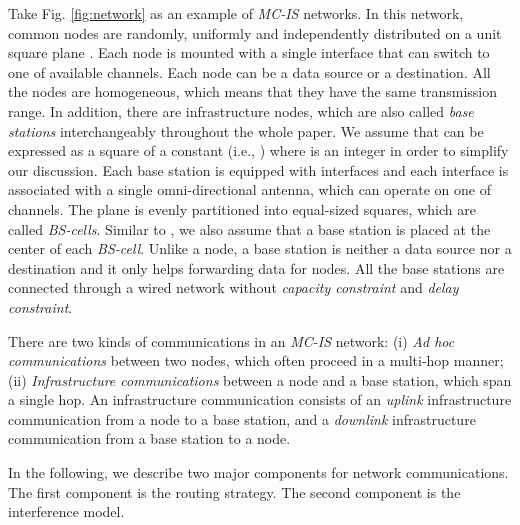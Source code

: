 \documentclass[10pt,journal]{IEEEtran}
\begin{document}
Take Fig. \ref{fig:network} as an example of \textit{MC-IS} networks. In this network,  common nodes are randomly, uniformly and independently distributed on a unit square plane . Each node is mounted with a single interface that can switch to one of  available channels. Each node can be a data source or a destination. All the nodes are homogeneous, which means that they have the same transmission range. In addition, there are  infrastructure nodes, which are also called \textit{base stations} interchangeably throughout the whole paper. We assume that  can be expressed as a square of a constant  (i.e., ) where  is an integer in order to simplify our discussion. Each base station is equipped with  interfaces and each interface is associated with a single omni-directional antenna, which can operate on one of  channels. The plane  is evenly partitioned into  equal-sized squares, which are called \textit{BS-cells}. Similar to \cite{bliu:infocom2003,panli:jsac09,XWang:TC2010}, we also assume that a base station is placed at the center of each \textit{BS-cell}. Unlike a node, a base station is neither a data source nor a destination and it only helps forwarding data for nodes. All the base stations are connected through a wired network without \textit{capacity constraint} and \textit{delay constraint}.

There are two kinds of communications in an \textit{MC-IS} network: (i) \textit{Ad hoc communications} between two nodes, which often proceed in a multi-hop manner; (ii) \textit{Infrastructure communications} between a node and a base station, which span a single hop. An infrastructure communication consists of an \textit{uplink} infrastructure communication from a node to a base station, and a \textit{downlink} infrastructure communication from a base station to a node.

In the following, we describe two major components for network communications. The first component is the routing strategy. The second component is the interference model.
\end{document}
